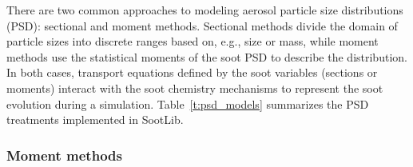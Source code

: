 \documentclass[preprint,letterpaper]{elsarticle}
\begin{document}
There are two common approaches to modeling aerosol particle size distributions (PSD): sectional and moment methods. Sectional methods divide the domain of particle sizes into discrete ranges based on, e.g., size or mass, while moment methods use the statistical moments of the soot PSD to describe the distribution. In both cases, transport equations defined by the soot variables (sections or moments) interact with the soot chemistry mechanisms to represent the soot evolution during a simulation. Table~\ref{t:psd_models} summarizes the PSD treatments implemented in SootLib.
%
\begin{table}
    \caption{Summary of soot particle size distribution models implemented in SootLib.}
    \label{t:psd_models}
    \centering
\end{table}
%

\subsubsection{Moment methods}
\label{s:moment-methods}
\end{document}
